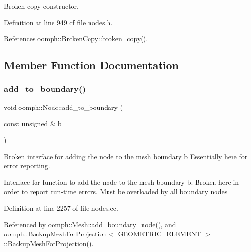Broken copy constructor. 



Definition at line 949 of file nodes.\+h.



References oomph\+::\+Broken\+Copy\+::broken\+\_\+copy().



\subsection{Member Function Documentation}
\mbox{\label{classoomph_1_1Node_a915ee24c67747f5e377014b024b9083f}} 
\subsubsection{\texorpdfstring{add\+\_\+to\+\_\+boundary()}{add\_to\_boundary()}}
{\footnotesize\ttfamily void oomph\+::\+Node\+::add\+\_\+to\+\_\+boundary (\begin{DoxyParamCaption}\item[{const unsigned \&}]{b }\end{DoxyParamCaption})\hspace{0.3cm}{\ttfamily [virtual]}}



Broken interface for adding the node to the mesh boundary b Essentially here for error reporting. 

Interface for function to add the node to the mesh boundary b. Broken here in order to report run-\/time errors. Must be overloaded by all boundary nodes 

Definition at line 2257 of file nodes.\+cc.



Referenced by oomph\+::\+Mesh\+::add\+\_\+boundary\+\_\+node(), and oomph\+::\+Backup\+Mesh\+For\+Projection$<$ G\+E\+O\+M\+E\+T\+R\+I\+C\+\_\+\+E\+L\+E\+M\+E\+N\+T $>$\+::\+Backup\+Mesh\+For\+Projection().

\mbox{\label{classoomph_1_1Node_a11400682e1fd2851777234a779e8bf8d}} 
